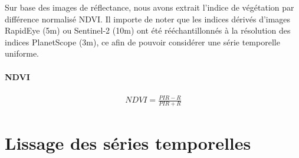 Sur base des images de réflectance, nous avons extrait l'indice de végétation par différence normalisé NDVI. Il importe de noter que les indices dérivés d'images RapidEye (5m) ou Sentinel-2 (10m) 
ont été rééchantillonnés à la résolution des indices PlanetScope (3m), ce afin de pouvoir considérer une série temporelle uniforme.

\paragraph{NDVI} \citep{Rouse1974,Tucker1979} 

\begin{align}
 NDVI = \frac{PIR - R}{PIR + R}
\end{align}



\section{Lissage des séries temporelles}

